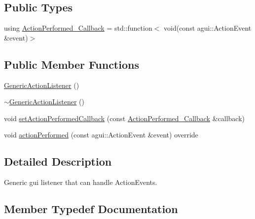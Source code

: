 \subsection*{Public Types}
\begin{DoxyCompactItemize}
\item 
using \mbox{\hyperlink{classec_1_1_generic_action_listener_ab58c5e9b4caf14e4d1b1e50ffff5e628}{Action\+Performed\+\_\+\+Callback}} = std\+::function$<$ void(const agui\+::\+Action\+Event \&event)$>$
\end{DoxyCompactItemize}
\subsection*{Public Member Functions}
\begin{DoxyCompactItemize}
\item 
\mbox{\hyperlink{classec_1_1_generic_action_listener_a70e7395994a0e7ff72e0af59d1f0d20d}{Generic\+Action\+Listener}} ()
\item 
\mbox{\hyperlink{classec_1_1_generic_action_listener_a4b840d6f59d0e222121b15ba45bd4c3c}{$\sim$\+Generic\+Action\+Listener}} ()
\item 
void \mbox{\hyperlink{classec_1_1_generic_action_listener_ae824ead75dce8eae0910da7432e3c400}{set\+Action\+Performed\+Callback}} (const \mbox{\hyperlink{classec_1_1_generic_action_listener_ab58c5e9b4caf14e4d1b1e50ffff5e628}{Action\+Performed\+\_\+\+Callback}} \&callback)
\item 
void \mbox{\hyperlink{classec_1_1_generic_action_listener_a559a752b60543f5deabfccb2eb6efaf8}{action\+Performed}} (const agui\+::\+Action\+Event \&event) override
\end{DoxyCompactItemize}


\subsection{Detailed Description}
Generic gui listener that can handle Action\+Events. 

\subsection{Member Typedef Documentation}
\mbox{\label{classec_1_1_generic_action_listener_ab58c5e9b4caf14e4d1b1e50ffff5e628}} 
